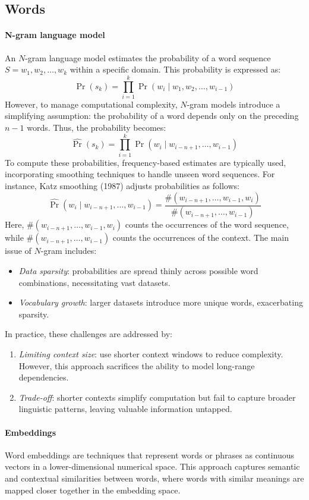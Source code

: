 \subsection{Words}
\paragraph*{N-gram language model}
An $N$-gram language model estimates the probability of a word sequence $S = w_1, w_2, \ldots, w_k$ within a specific domain.
This probability is expressed as:
\[\Pr(s_k) = \prod_{i=1}^{k} \Pr(w_i \mid w_1, w_2, \ldots, w_{i-1})\]
However, to manage computational complexity, $N$-gram models introduce a simplifying assumption: the probability of a word depends only on the preceding $n-1$ words. 
Thus, the probability becomes:
\[\hat{\Pr}(s_k) = \prod_{i=1}^{k} \Pr(w_i \mid w_{i-n+1}, \ldots, w_{i-1})\]
To compute these probabilities, frequency-based estimates are typically used, incorporating smoothing techniques to handle unseen word sequences. 
For instance, Katz smoothing (1987) adjusts probabilities as follows:
\[\hat{\Pr}(w_i \mid w_{i-n+1}, \ldots, w_{i-1}) = \frac{\#(w_{i-n+1}, \dots, w_{i-1}, w_i)}{\#(w_{i-n+1}, \dots, w_{i-1})}\]
Here, $\#(w_{i-n+1}, \dots, w_{i-1}, w_i)$ counts the occurrences of the word sequence, while $\#(w_{i-n+1}, \dots, w_{i-1})$ counts the occurrences of the context.
The main issue of $N$-gram includes:
\begin{itemize}
    \item \textit{Data sparsity}: probabilities are spread thinly across possible word combinations, necessitating vast datasets.
    \item \textit{Vocabulary growth}: larger datasets introduce more unique words, exacerbating sparsity.
\end{itemize}
\noindent In practice, these challenges are addressed by:
\begin{enumerate}
    \item \textit{Limiting context size}: use shorter context windows to reduce complexity. 
        However, this approach sacrifices the ability to model long-range dependencies.
    \item \textit{Trade-off}: shorter contexts simplify computation but fail to capture broader linguistic patterns, leaving valuable information untapped.
\end{enumerate}

\paragraph*{Embeddings}
Word embeddings are techniques that represent words or phrases as continuous vectors in a lower-dimensional numerical space. 
This approach captures semantic and contextual similarities between words, where words with similar meanings are mapped closer together in the embedding space.

